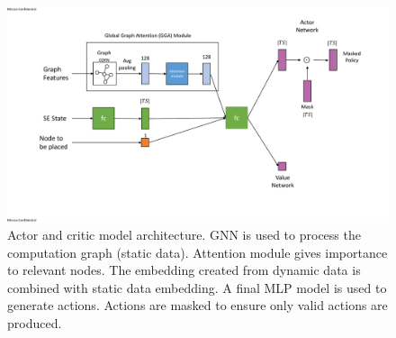 \begin{figure}[h]
  \centering
  \includegraphics[width=\textwidth]{fig/model_diagram.pdf}
  \caption{Actor and critic model architecture. GNN is used to process the computation graph (static data). 
  Attention module gives importance to relevant nodes. The embedding created from dynamic data is combined with static data embedding. 
  A final MLP model is used to generate actions. Actions are masked to ensure only valid actions are produced. }
  \label{fig:model}
\end{figure}




